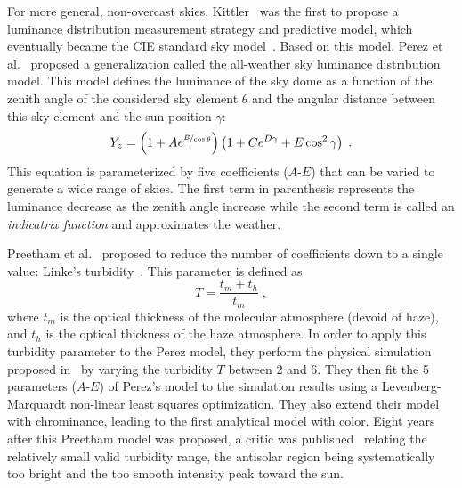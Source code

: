 
For more general, non-overcast skies, Kittler~\cite{kittler1985luminance} was the first to propose a luminance distribution measurement strategy and predictive model, which eventually became the CIE standard sky model~\cite{darula-cie-sky}. Based on this model, Perez et al.~\cite{perez1993allweather} proposed a generalization called the all-weather sky luminance distribution model. This model defines the luminance of the sky dome as a function of the zenith angle of the considered sky element $\theta$ and the angular distance between this sky element and the sun position $\gamma$:
\begin{equation}
Y_z = \left( 1 + A e^{\nicefrac{B}{\cos\theta}} \right)\left( 1 + C e^{D\gamma} + E \cos^2 \gamma \right) \;.
\label{eq:perez}
\end{equation}
This equation is parameterized by five coefficients ($A$-$E$) that can be varied to generate a wide range of skies. The first term in parenthesis represents the luminance decrease as the zenith angle increase while the second term is called an \emph{indicatrix function} and approximates the weather.

Preetham et al.~\cite{preetham-siggraph-99} proposed to reduce the number of coefficients down to a single value: Linke's turbidity~\cite{mccartney1976optics}. This parameter is defined as
\begin{equation}
T = \frac{t_m + t_h}{t_m} \;,
\end{equation}
where $t_m$ is the optical thickness of the molecular atmosphere (devoid of haze), and $t_h$ is the optical thickness of the haze atmosphere. In order to apply this turbidity parameter to the Perez model, they perform the physical simulation proposed in~\cite{nishita1996display} by varying the turbidity $T$ between 2 and 6. They then fit the 5 parameters ($A$-$E$) of Perez's model to the simulation results using a Levenberg-Marquardt non-linear least squares optimization. They also extend their model with chrominance, leading to the first analytical model with color. 
Eight years after this Preetham model was proposed, a critic was published~\cite{zotti2007critical} relating the relatively small valid turbidity range, the antisolar region being systematically too bright and the too smooth intensity peak toward the sun.

